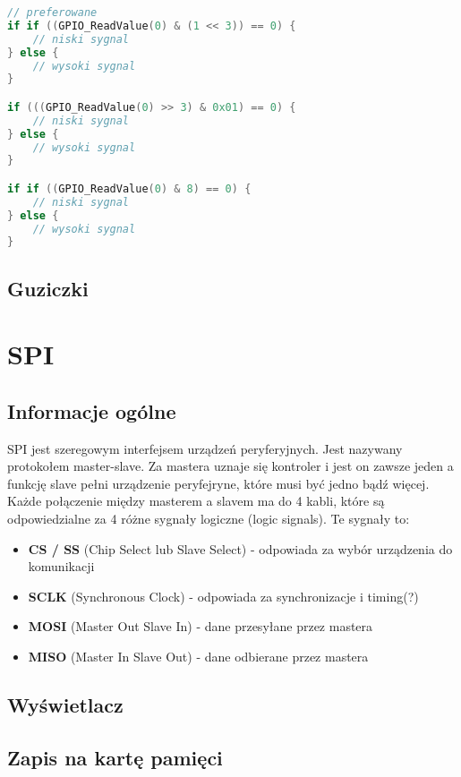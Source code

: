 \documentclass[11pt]{article}
\begin{document}
\begin{lstlisting}[language=c]
// preferowane
if if ((GPIO_ReadValue(0) & (1 << 3)) == 0) {
    // niski sygnal
} else {
    // wysoki sygnal
}

if (((GPIO_ReadValue(0) >> 3) & 0x01) == 0) {
    // niski sygnal
} else {
    // wysoki sygnal
}

if if ((GPIO_ReadValue(0) & 8) == 0) {
    // niski sygnal
} else {
    // wysoki sygnal
}
\end{lstlisting}
\subsection{Guziczki}

\section{SPI}
\subsection{Informacje ogólne}
SPI jest szeregowym interfejsem urządzeń peryferyjnych. Jest nazywany
protokołem master-slave. Za mastera uznaje się kontroler i jest on zawsze
jeden a funkcję slave pełni urządzenie peryfejryne, które musi być jedno bądź więcej.
Każde połączenie między masterem a slavem ma do 4 kabli, które są odpowiedzialne
za 4 różne sygnały logiczne (logic signals). Te sygnały to:
\begin{itemize}
    \item {
        \textbf{CS / SS} (Chip Select lub Slave Select) - odpowiada za wybór 
        urządzenia do komunikacji
    }
    \item {
        \textbf{SCLK} (Synchronous Clock) - odpowiada za synchronizacje i timing(?)
    }
    \item {
        \textbf{MOSI} (Master Out Slave In) - dane przesyłane
        przez mastera
    }
    \item {
        \textbf{MISO} (Master In Slave Out) - dane odbierane przez
        mastera
    }
\end{itemize}


\subsection{Wyświetlacz}
\subsection{Zapis na kartę pamięci}
\end{document}

